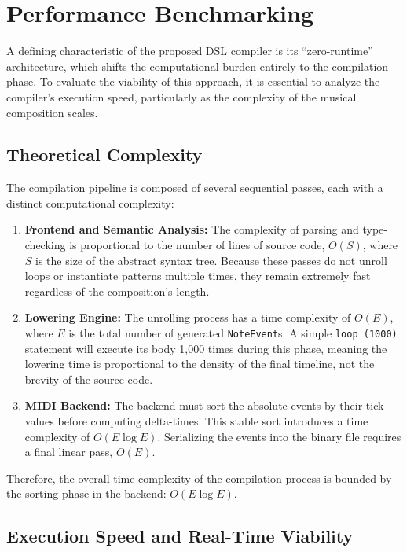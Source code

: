 \section{Performance Benchmarking}\label{sec:evaluation-benchmarking}

A defining characteristic of the proposed DSL compiler is its ``zero-runtime'' architecture, which shifts the
computational burden entirely to the compilation phase.
To evaluate the viability of this approach, it is essential to analyze the compiler's execution speed, particularly as
the complexity of the musical composition scales.

\subsection{Theoretical Complexity}\label{subsec:theoretical-complexity}

The compilation pipeline is composed of several sequential passes, each with a distinct computational complexity:
\begin{enumerate}
  \item \textbf{Frontend and Semantic Analysis:} The complexity of parsing and type-checking is proportional to the
    number of lines of source code, $O(S)$, where $S$ is the size of the abstract syntax tree.
    Because these passes do not unroll loops or instantiate patterns multiple times, they remain extremely fast
    regardless of the composition's length.
  \item \textbf{Lowering Engine:} The unrolling process has a time complexity of $O(E)$, where $E$ is the total number
    of generated \texttt{NoteEvent}s. A simple \texttt{loop (1000)} statement will execute its body 1,000 times during
    this phase, meaning the lowering time is proportional to the density of the final timeline, not the brevity of the
    source code.
  \item \textbf{MIDI Backend:} The backend must sort the absolute events by their tick values before computing
    delta-times.
    This stable sort introduces a time complexity of $O(E \log E)$.
    Serializing the events into the binary file requires a final linear pass, $O(E)$.
\end{enumerate}
Therefore, the overall time complexity of the compilation process is bounded by the sorting phase in the backend:
$O(E \log E)$.

\subsection{Execution Speed and Real-Time Viability}\label{subsec:execution-speed-and-real-time-viability}


